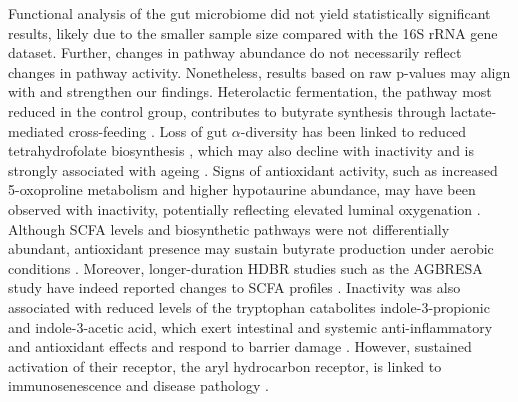 \documentclass[preprint,12pt,authoryear]{elsarticle}
\begin{document}
    Functional analysis of the gut microbiome did not yield statistically significant results, likely due to the smaller sample size compared with the 16S rRNA gene dataset. Further, changes in pathway abundance do not necessarily reflect changes in pathway activity. Nonetheless, results based on raw p-values may align with and strengthen our findings. Heterolactic fermentation, the pathway most reduced in the control group, contributes to butyrate synthesis through lactate-mediated cross-feeding \citep{daisleyEmergingConnectionsGut2021, irapordaLactateShortChain2015, leeMicrobiotaDerivedLactateAccelerates2018}. Loss of gut $\alpha$-diversity has been linked to reduced tetrahydrofolate biosynthesis \citep{daisleyEmergingConnectionsGut2021}, which may also decline with inactivity and is strongly associated with ageing \citep{lionakiOneCarbonMetabolismPulling2022}. Signs of antioxidant activity, such as increased 5-oxoproline metabolism and higher hypotaurine abundance, may have been observed with inactivity, potentially reflecting elevated luminal oxygenation \citep{deshmukhNonenzymaticSelfEliminationDegradation2009, aruomaAntioxidantActionTaurine1988, clausSystemicMulticompartmentalEffects2008}. Although SCFA levels and biosynthetic pathways were not differentially abundant, antioxidant presence may sustain butyrate production under aerobic conditions \citep{millionAntioxidantsGlutathioneAscorbic2020}. Moreover, longer-duration HDBR studies such as the AGBRESA study have indeed reported changes to SCFA profiles \citep{ramos-nascimentoHumanGutMicrobiome2023}. Inactivity was also associated with reduced levels of the tryptophan catabolites indole-3-propionic and indole-3-acetic acid, which exert intestinal and systemic anti-inflammatory and antioxidant effects and respond to barrier damage \citep{chyanPotentNeuroprotectiveProperties1999, krishnanGutMicrobiotaDerivedTryptophan2018, venkateshSymbioticBacterialMetabolites2014, hwangIndole3propionicAcidAttenuates2009}. However, sustained activation of their receptor, the aryl hydrocarbon receptor, is linked to immunosenescence and disease pathology \citep{mitchellTimingEverythingConsequences2009}.

    
\end{document}
